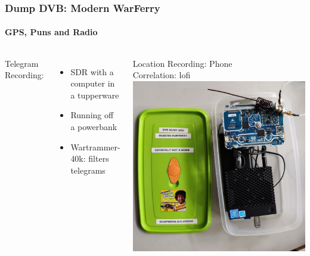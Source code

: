 \begin{frame}
  \frametitle{Dump DVB: Modern WarFerry}
  \framesubtitle{GPS, Puns and Radio}
  \begin{columns}
      Telegram Recording:
        \begin{itemize}
      \item SDR with a computer in a tupperware
      \item Running off a powerbank
      \item Wartrammer-40k: filters telegrams
    \end{itemize}
      Location Recording: Phone\\
      Correlation: lofi
    \includegraphics[width=\columnwidth]{./figs/warferry-nude.jpg}
  \end{columns}
\end{frame}

